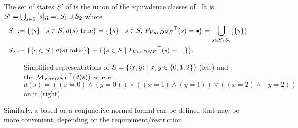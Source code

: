 \documentclass[preview]{standalone}
\begin{document}
\noindent The set of states ${S}'$ of \viewparamdnf is the union of the equivalence classes of \eqrelview. It is ${S}' = \bigcup_{{s} \in {S}} {{[{s}]_{{R}}}} =: {S}_1 \cup {S}_2$ where
\begin{align*}
	\states_1 &:= \{\{\state\} \mid \state \in \states, \, d(s) \text{ true}\} = \{\{\state\} \mid \state \in \states, \, \gfctparamdnf(\state) = \remelem\} = \nogroupstates \\
	\states_2 &:= \{\{\state \in \states \mid d(s) \text{ false}\}\} = \{\{\state \in \states \mid \gfctparamdnf(\state) = \notppty\}\}.
\end{align*}
\begin{figure}[!htb]
	\begin{minipage}{.6\textwidth}
		
	\end{minipage}%
	\begin{minipage}{.5\textwidth}
		
	\end{minipage}
	\caption{Simplified representations of \mdp ${S} = \{{\langle x,y\rangle} \mid x,y \in \{0, 1, 2\}\}$ (left) and the \viewN ${{{{{\mathcal{M}}}}_{{VarDNF}}}^{\top}}(d({s}))$ where $d(s) = ((x=0) \land (y=0)) \lor ((x=1) \land (y=1)) \lor ((x=2) \land (y=2))$ on it (right)}
	\label{fig:varsDnf} 
\end{figure}

\noindent Similarly, a \viewN based on a conjunctive normal formal can be defined that may be more convenient, depending on the requirement/restriction.
\end{document}
